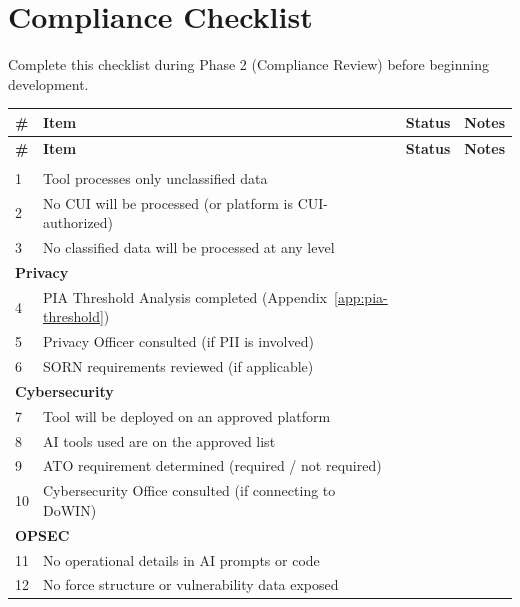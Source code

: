 \documentclass[11pt,letterpaper]{article}
\begin{document}
\newpage
\section{Compliance Checklist}
\label{app:compliance-checklist}

Complete this checklist during Phase 2 (Compliance Review) before beginning development.

\begin{longtable}{@{}p{0.6cm}p{8.9cm}p{1.3cm}p{2.5cm}@{}}
\toprule
\textbf{\#} & \textbf{Item} & \textbf{Status} & \textbf{Notes} \\
\midrule
\endfirsthead
\toprule
\textbf{\#} & \textbf{Item} & \textbf{Status} & \textbf{Notes} \\
\midrule
\endhead
\bottomrule
\endlastfoot
\multicolumn{4}{l}{\textbf{Data Classification}} \\
\midrule
1 & Tool processes only unclassified data & & \\
\midrule
2 & No CUI will be processed (or platform is CUI-authorized) & & \\
\midrule
3 & No classified data will be processed at any level & & \\
\midrule
\multicolumn{4}{l}{\textbf{Privacy}} \\
\midrule
4 & PIA Threshold Analysis completed (Appendix~\ref{app:pia-threshold}) & & \\
\midrule
5 & Privacy Officer consulted (if PII is involved) & & \\
\midrule
6 & SORN requirements reviewed (if applicable) & & \\
\midrule
\multicolumn{4}{l}{\textbf{Cybersecurity}} \\
\midrule
7 & Tool will be deployed on an approved platform & & \\
\midrule
8 & AI tools used are on the approved list & & \\
\midrule
9 & ATO requirement determined (required / not required) & & \\
\midrule
10 & Cybersecurity Office consulted (if connecting to DoWIN) & & \\
\midrule
\multicolumn{4}{l}{\textbf{OPSEC}} \\
\midrule
11 & No operational details in AI prompts or code & & \\
\midrule
12 & No force structure or vulnerability data exposed & & \\

\end{longtable}
\end{document}

